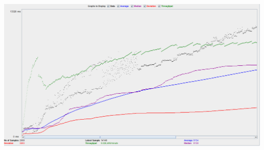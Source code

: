 \documentclass[11pt,twoside,a4paper]{article}
\begin{document}
\includegraphics[scale=0.80, angle=90]{../latex_extra/images/graph.png}
\end{document}
